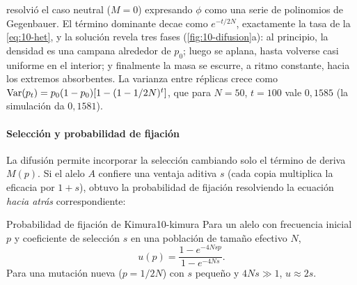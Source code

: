 \begin{simbolos}
\end{simbolos}

\textcite{c10-kimura1955} resolvió el caso neutral ($M=0$) expresando $\phi$ como una serie de polinomios de Gegenbauer. El término dominante decae como $e^{-t/2N}$, exactamente la tasa de la \cref{eq:10-het}, y la solución revela tres fases (\cref{fig:10-difusion}a): al principio, la densidad es una campana alrededor de $p_0$; luego se aplana, hasta volverse casi uniforme en el interior; y finalmente la masa se escurre, a ritmo constante, hacia los extremos absorbentes. La varianza entre réplicas crece como $\operatorname{Var}(p_t)=p_0(1-p_0)[1-(1-1/2N)^t]$, que para $N=50$, $t=100$ vale $0{,}1585$ (la simulación da $0{,}1581$).

\paragraph{Selección y probabilidad de fijación} La difusión permite incorporar la selección cambiando solo el término de deriva $M(p)$. Si el alelo $A$ confiere una ventaja aditiva $s$ (cada copia multiplica la eficacia por $1+s$), \textcite{c10-kimura1962} obtuvo la probabilidad de fijación resolviendo la ecuación \emph{hacia atrás} correspondiente:

\begin{teorema}{Probabilidad de fijación de Kimura}{10-kimura}
Para un alelo con frecuencia inicial $p$ y coeficiente de selección $s$ en una población de tamaño efectivo $N$,
\begin{equation}\label{eq:10-kimura}
u(p) = \frac{1-e^{-4Nsp}}{1-e^{-4Ns}}.
\end{equation}
Para una mutación nueva ($p=1/2N$) con $s$ pequeño y $4Ns\gg1$, $u\approx 2s$.
\end{teorema}

\begin{simbolos}
\end{simbolos}

